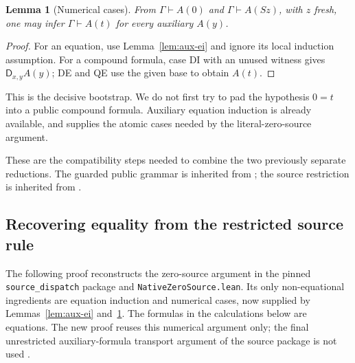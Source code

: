 \documentclass[11pt,letterpaper]{article}
\newtheorem{lemma}[theorem]{Lemma}
\theoremstyle{definition}\newtheorem{definition}[theorem]{Definition}
\theoremstyle{remark}\newtheorem{remark}[theorem]{Remark}
\newcommand{\D}{\mathsf D}
\begin{document}
\begin{lemma}[Numerical cases]\label{lem:aux-cases}
From $\Gamma\vdash A(0)$ and $\Gamma\vdash A(Sz)$, with $z$ fresh,
one may infer $\Gamma\vdash A(t)$ for every auxiliary $A(y)$.
\end{lemma}
\begin{proof}
For an equation, use Lemma~\ref{lem:aux-ei} and ignore its local induction
assumption.  For a compound formula, case DI with an unused witness
gives $\D_{x,y}A(y)$; DE and QE use the given base to obtain $A(t)$.
\end{proof}

This is the decisive bootstrap.  We do not first try to pad the hypothesis
$0=t$ into a public compound formula.  Auxiliary equation induction is
already available, and supplies the atomic cases needed by the
literal-zero-source argument.

These are the compatibility steps needed to combine the two previously
separate reductions.  The guarded public grammar is inherited from
\cite{guarded}; the source restriction is inherited from \cite{source}.

\subsection{Recovering equality from the restricted source rule}

The following proof reconstructs the zero-source argument in the pinned
\texttt{source\_dispatch} package and
\texttt{NativeZeroSource.lean}.  Its only non-equational ingredients are
equation induction and numerical cases, now supplied by
Lemmas~\ref{lem:aux-ei} and~\ref{lem:aux-cases}.  The formulas in the
calculations below are equations.
The new proof reuses this numerical argument only; the final unrestricted
auxiliary-formula transport argument of the source package is not used
\cite{source,lean-zero}.
\end{document}
